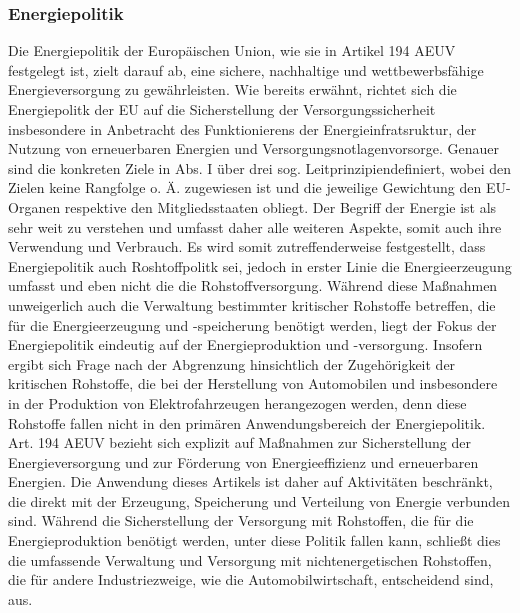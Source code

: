 \documentclass[12pt,a4paper,oneside]{book} %
\begin{document}
	\subsubsection{Energiepolitik}
	Die Energiepolitik der Europäischen Union, wie sie in Artikel 194 AEUV festgelegt ist, zielt darauf ab, eine sichere, nachhaltige und wettbewerbsfähige Energieversorgung zu gewährleisten. Wie bereits erwähnt, richtet sich die Energiepolitk der EU auf die Sicherstellung der Versorgungssicherheit insbesondere in Anbetracht des Funktionierens der Energieinfratsruktur, der Nutzung von erneuerbaren Energien und Versorgungsnotlagenvorsorge.\autocite[387]{frau_rohstoffe_2025} Genauer sind die konkreten Ziele in Abs. I über drei sog. \glqq Leitprinzipien\grqq definiert, wobei den Zielen keine Rangfolge o. Ä. zugewiesen ist und die jeweilige Gewichtung den EU-Organen respektive den Mitgliedsstaaten obliegt.\autocite[Gundel § M Rn. 26 27]{dauses_handbuch_2024} 
	Der Begriff der Energie ist als sehr weit zu verstehen und umfasst daher alle weiteren Aspekte, somit auch ihre Verwendung und Verbrauch.\autocite[Hamer Art. 194 Rn 8]{von_der_groeben_europaisches_2024} 
	Es wird somit zutreffenderweise festgestellt, dass Energiepolitik auch Roshtoffpolitk sei, jedoch in erster Linie die Energieerzeugung umfasst und eben nicht die die Rohstoffversorgung. Während diese Maßnahmen unweigerlich auch die Verwaltung bestimmter kritischer Rohstoffe betreffen, die für die Energieerzeugung und -speicherung benötigt werden, liegt der Fokus der Energiepolitik eindeutig auf der Energieproduktion und -versorgung.
	Insofern ergibt sich Frage nach der Abgrenzung hinsichtlich der Zugehörigkeit der kritischen Rohstoffe, die bei der Herstellung von Automobilen und insbesondere in der Produktion von Elektrofahrzeugen herangezogen werden, denn diese Rohstoffe fallen nicht in den primären Anwendungsbereich der Energiepolitik. Art. 194 AEUV bezieht sich explizit auf Maßnahmen zur Sicherstellung der Energieversorgung und zur Förderung von Energieeffizienz und erneuerbaren Energien. Die Anwendung dieses Artikels ist daher auf Aktivitäten beschränkt, die direkt mit der Erzeugung, Speicherung und Verteilung von Energie verbunden sind. Während die Sicherstellung der Versorgung mit Rohstoffen, die für die Energieproduktion benötigt werden, unter diese Politik fallen kann, schließt dies die umfassende Verwaltung und Versorgung mit nichtenergetischen Rohstoffen, die für andere Industriezweige, wie die Automobilwirtschaft, entscheidend sind, aus.
	
\end{document}
